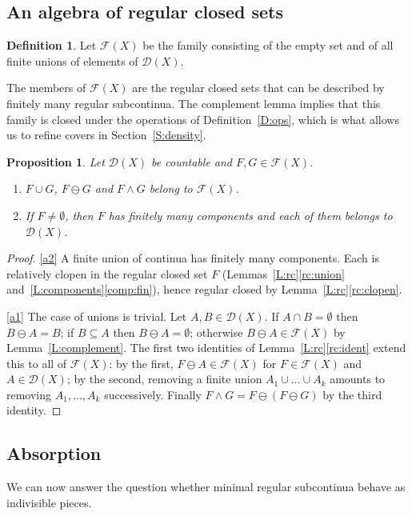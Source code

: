 \documentclass[11pt,reqno]{amsart}
\theoremstyle{plain}
\newtheorem{proposition}[theorem]{Proposition}
\theoremstyle{definition}
\newtheorem{definition}[theorem]{Definition}
\theoremstyle{remark}
\newcommand{\D}{\mathcal{D}}
\newcommand{\F}{\mathscr{F}}
\newcommand{\rd}{\ominus}
\begin{document}
\subsection{An algebra of regular closed sets}

\begin{definition}
Let $\F(X)$ be the family consisting of the empty set and of all finite unions of elements of $\D(X)$.
\end{definition}

The members of $\F(X)$ are the regular closed sets that can be described by finitely many regular subcontinua. The complement lemma implies that this family is closed under the operations of Definition~\ref{D:ops}, which is what allows us to refine covers in Section~\ref{S:density}.

\begin{proposition}\label{P:algebra}
Let $\D(X)$ be countable and $F,G\in\F(X)$.
\begin{enumerate}[label=\textup{(\arabic*)}]
\item\label{a1} $F\cup G$, $F\rd G$ and $F\wedge G$ belong to $\F(X)$.
\item\label{a2} If $F\neq\emptyset$, then $F$ has finitely many components and each of them belongs to $\D(X)$.
\end{enumerate}
\end{proposition}

\begin{proof}
\ref{a2} A finite union of continua has finitely many components. Each is relatively clopen in the regular closed set $F$ (Lemmas~\ref{L:rc}\ref{rc:union} and~\ref{L:components}\ref{comp:fin}), hence regular closed by Lemma~\ref{L:rc}\ref{rc:clopen}.

\ref{a1} The case of unions is trivial. Let $A,B\in\D(X)$. If $A\cap B=\emptyset$ then $B\rd A=B$; if $B\subseteq A$ then $B\rd A=\emptyset$; otherwise $B\rd A\in\F(X)$ by Lemma~\ref{L:complement}. The first two identities of Lemma~\ref{L:rc}\ref{rc:ident} extend this to all of $\F(X)$: by the first, $F\rd A\in\F(X)$ for $F\in\F(X)$ and $A\in\D(X)$; by the second, removing a finite union $A_1\cup\dots\cup A_k$ amounts to removing $A_1,\dots,A_k$ successively. Finally $F\wedge G=F\rd(F\rd G)$ by the third identity.
\end{proof}

\subsection{Absorption}
We can now answer the question whether minimal regular subcontinua behave as indivisible pieces.
\end{document}

